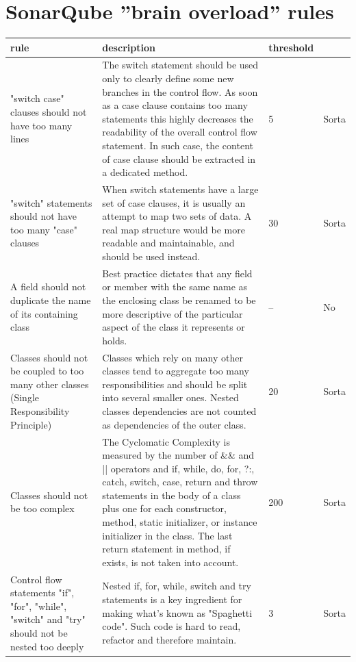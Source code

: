 \documentclass{article}
\begin{document}
\clearpage

\section{SonarQube ''brain overload'' rules}
\begin{longtable}{L{3cm}|L{8cm}|L{1cm}|L{1cm}}
rule & description & threshold & \cite{Atwood06} \\
\toprule
 "switch case" clauses should not have too many lines & The switch statement should be used only to clearly define some new branches in the control flow. As soon as a case clause contains too many statements this highly decreases the readability of the overall control flow statement. In such case, the content of case clause should be extracted in a dedicated method. & 5 & Sorta \\
 \midrule
"switch" statements should not have too many "case" clauses & When switch statements have a large set of case clauses, it is usually an attempt to map two sets of data. A real map structure would be more readable and maintainable, and should be used instead. & 30 & Sorta\\
\midrule
A field should not duplicate the name of its containing class & Best practice dictates that any field or member with the same name as the enclosing class be renamed to be more descriptive of the particular aspect of the class it represents or holds. & -- & No \\
\midrule
Classes should not be coupled to too many other classes (Single Responsibility Principle) & Classes which rely on many other classes tend to aggregate too many responsibilities and should be split into several smaller ones. Nested classes dependencies are not counted as dependencies of the outer class. & 20 & Sorta \\ 
\midrule
Classes should not be too complex & The Cyclomatic Complexity is measured by the number of \&\& and || operators and if, while, do, for, ?:, catch, switch, case, return and throw statements in the body of a class plus one for each constructor, method, static initializer, or instance initializer in the class. The last return statement in method, if exists, is not taken into account. & 200 & Sorta \\ 
\midrule
Control flow statements "if", "for", "while", "switch" and "try" should not be nested too deeply & Nested if, for, while, switch and try statements is a key ingredient for making what's known as "Spaghetti code". Such code is hard to read, refactor and therefore maintain. & 3 & Sorta \\

\end{longtable}
\end{document}
